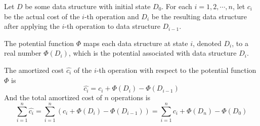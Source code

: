 \begin{definition} 
    Let $D$ be some data structure with initial state $D_0$. For each $i = 1,2,\cdots,n$, let $c_i$ be the actual cost of the $i$-th operation and $D_i$ be the resulting data structure after applying the $i$-th operation to data structure $D_{i-1}$.

    The potential function $\Phi$ maps each data structure at state $i$, denoted $D_i$, to a real number $\Phi(D_i)$, which is the potential associated with data structure $D_i$.

    The amortized cost $\hat{c_i}$ of the $i$-th operation with respect to the potential function $\Phi$ is
    $$
    \hat{c_i} = c_i + \Phi(D_i) - \Phi(D_{i-1})
    $$
    And the total amortized cost of $n$ operations is
    $$
    \sum_{i=1}^{n} \hat{c_i} = \sum_{i=1}^{n} \left( c_i + \Phi(D_i) - \Phi(D_{i-1}) \right) = \sum_{i=1}^{n} c_i + \Phi(D_n) - \Phi(D_0)
    $$
\end{definition}